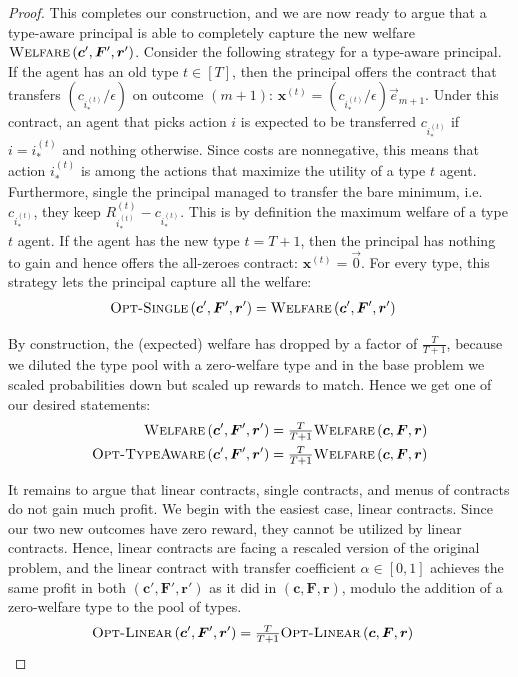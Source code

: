 \documentclass{article}
\newcommand{\cost}[1]{c_{#1}}
\newcommand{\costvector}{\bm{c}}
\newcommand{\ForecastTensor}{\bm{F}}
\newcommand{\rewardvector}{\bm{r}}
\newcommand{\TypedExpectedReward}[2]{R^{(#1)}_{#2}}
\newcommand{\PrincipalAgentProblem}{\left(\costvector, \ForecastTensor, \rewardvector\right)}
\newcommand{\PrincipalAgentProblemPrime}{\left(\costvector', \ForecastTensor', \rewardvector'\right)}
\newcommand{\TypedContractVector}[1]{\bm{x}^{(#1)}}
\newcommand{\TransferCoefficient}{\alpha}
\newcommand{\OptimalAction}{i_*}
\newcommand{\TypedOptimalAction}[1]{\OptimalAction^{(#1)}}
\newcommand{\OWelfare}{\textsc{Welfare}}
\newcommand{\OTypeAware}{\textsc{Opt-TypeAware}}
\newcommand{\OSingle}{\textsc{Opt-Single}}
\newcommand{\OLinear}{\textsc{Opt-Linear}}
\newcommand{\StandardBasisVector}[1]{\vec{e}_{#1}}
\begin{document}
\begin{proof}
  This completes our construction, and we are now ready to argue that a type-aware principal is able to completely capture the new welfare $\OWelfare \PrincipalAgentProblemPrime$. Consider the following strategy for a type-aware principal. If the agent has an old type $t \in [T]$, then the principal offers the contract that transfers $\left(\cost{\TypedOptimalAction{t}} / \epsilon \right)$ on outcome $(m + 1)$: $\TypedContractVector{t} = \left( \cost{\TypedOptimalAction{t}} / \epsilon \right) \StandardBasisVector{m+1}$. Under this contract, an agent that picks action $i$ is expected to be transferred $\cost{\TypedOptimalAction{t}}$ if $i = \TypedOptimalAction{t}$ and nothing otherwise. Since costs are nonnegative, this means that action $\TypedOptimalAction{t}$ is among the actions that maximize the utility of a type $t$ agent. Furthermore, single the principal managed to transfer the bare minimum, i.e. $\cost{\TypedOptimalAction{t}}$, they keep $\TypedExpectedReward{t}{\TypedOptimalAction{t}} - \cost{\TypedOptimalAction{t}}$. This is by definition the maximum welfare of a type $t$ agent. If the agent has the new type $t = T + 1$, then the principal has nothing to gain and hence offers the all-zeroes contract: $\TypedContractVector{t} = \vec{0}$. For every type, this strategy lets the principal capture all the welfare:
  \begin{align*}
    \OSingle \PrincipalAgentProblemPrime &= \OWelfare \PrincipalAgentProblemPrime
  \end{align*}
  
  By construction, the (expected) welfare has dropped by a factor of $\tfrac{T}{T+1}$, because we diluted the type pool with a zero-welfare type and in the base problem we scaled probabilities down but scaled up rewards to match. Hence we get one of our desired statements:
  \begin{align*}
    \OWelfare \PrincipalAgentProblemPrime &= \tfrac{T}{T+1} \OWelfare \PrincipalAgentProblem \\
    \OTypeAware \PrincipalAgentProblemPrime &= \tfrac{T}{T+1} \OWelfare \PrincipalAgentProblem
  \end{align*}
  
  It remains to argue that linear contracts, single contracts, and menus of contracts do not gain much profit. We begin with the easiest case, linear contracts. Since our two new outcomes have zero reward, they cannot be utilized by linear contracts. Hence, linear contracts are facing a rescaled version of the original problem, and the linear contract with transfer coefficient $\TransferCoefficient \in [0, 1]$ achieves the same profit in both $\PrincipalAgentProblemPrime$ as it did in $\PrincipalAgentProblem$, modulo the addition of a zero-welfare type to the pool of types.
  \begin{align*}
    \OLinear \PrincipalAgentProblemPrime &= \tfrac{T}{T+1} \OLinear \PrincipalAgentProblem
  \end{align*}
  

\end{proof}
\end{document}
